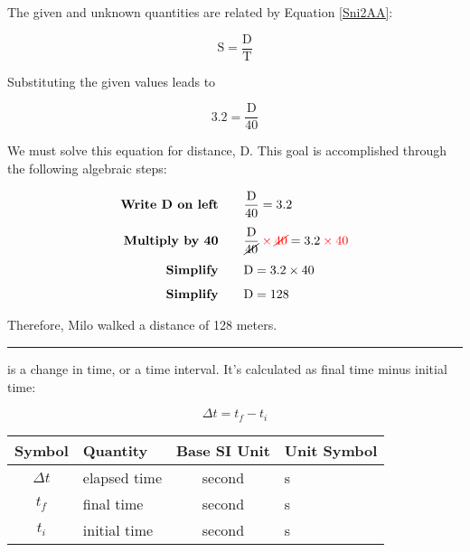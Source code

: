 \documentclass{article}
\begin{document}
\vspace{1em}

The given and unknown quantities are related by Equation \eqref{Sni2AA}:

\begin{equation*}
    \mathrm{S = \frac{D}{T}}
\end{equation*}

Substituting the given values leads to 

\begin{equation*}
    3.2 = \frac{\text{D}}{40}
\end{equation*}

We must solve this equation for distance, $\text{D}$. This goal is accomplished through the following algebraic steps:

\begin{align*}
    \textbf{Write $\text{D}$ on left}  \qquad & \frac{\text{D}}{40} = 3.2 \\[1ex]
    \textbf{Multiply by 40} \qquad & \frac{\text{D}}{\cancel{40}} \mathbin{\color{red} \times} \textcolor{red}{\cancel{40}} = 3.2 \mathbin{\color{red} \times} \textcolor{red}{40}\\[1ex]
    \textbf{Simplify} \qquad & \text{D} = 3.2 \times 40\\[1ex]
    \textbf{Simplify} \qquad & \mathrm{D} = 128
\end{align*}

Therefore, Milo walked a distance of 128 meters.

\hrule

\vspace{1em}

 is a change in time, or a time interval. It's calculated as final time minus initial time:

\begin{equation}
    \Delta{t} = t_f - t_i
\end{equation}

\begin{center}
    \begin{tabular}{cl|cl}
    \hline
    \textbf{Symbol} & \textbf{Quantity} & \textbf{Base SI Unit} & \textbf{Unit Symbol}  \\
    \hline\hline
        $\Delta{t}$ & elapsed time & second & s\\
        $t_f$ & final time & second & s\\
        $t_i$ & initial time & second & s\\
    \hline
    \end{tabular}
\end{center}
\end{document}
